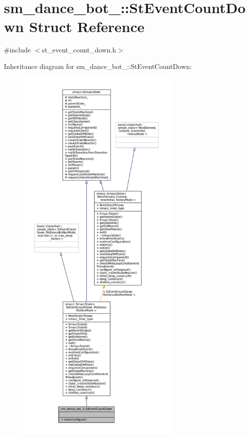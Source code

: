 \hypertarget{structsm__dance__bot__3_1_1StEventCountDown}{}\section{sm\+\_\+dance\+\_\+bot\+\_\+:\+:St\+Event\+Count\+Down Struct Reference}
\label{structsm__dance__bot__3_1_1StEventCountDown}


{\ttfamily \#include $<$st\+\_\+event\+\_\+count\+\_\+down.\+h$>$}



Inheritance diagram for sm\+\_\+dance\+\_\+bot\+\_\+:\+:St\+Event\+Count\+Down\+:
\nopagebreak
\begin{figure}[H]
\begin{center}
\leavevmode
\includegraphics[height=550pt]{structsm__dance__bot__3_1_1StEventCountDown__inherit__graph}
\end{center}
\end{figure}


